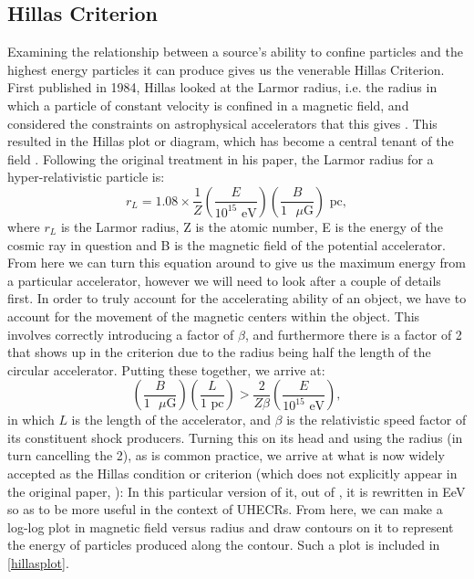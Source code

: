 \subsection{Hillas Criterion}
Examining the relationship between a source's ability to confine particles and the highest energy particles it can produce gives us the venerable Hillas Criterion. First published in 1984, Hillas looked at the Larmor radius, i.e. the radius in which a particle of constant velocity is confined in a magnetic field, and considered the constraints on astrophysical accelerators that this gives \cite{hillas}. This resulted in the Hillas plot or diagram, which has become a central tenant of the field \cite{stanev}. Following the original treatment in his paper, the Larmor radius for a hyper-relativistic particle is:
$$ r_L=1.08\times\frac{1}{Z}\left(\frac{E}{10^{15}\mbox{ eV}}\right)\left(\frac{B}{1\mbox{ $\mu$G}}\right)\mbox{ pc}, $$
where $r_L$ is the Larmor radius, Z is the atomic number, E is the energy of the cosmic ray in question and B is the magnetic field of the potential accelerator. From here we can turn this equation around to give us the maximum energy from a particular accelerator, however we will need to look after a couple of details first. In order to truly account for the accelerating ability of an object, we have to account for the movement of the magnetic centers within the object. This involves correctly introducing a factor of $\beta$, and furthermore there is a factor of 2 that shows up in the criterion due to the radius being half the length of the circular accelerator. Putting these together, we arrive at:
$$\left(\frac{B}{1\mbox{ $\mu$G}}\right) \left(\frac{L}{1\mbox{ pc}}\right)>\frac{2}{Z \beta}\left(\frac{E}{10^{15}\mbox{ eV}}\right),$$
in which $L$ is the length of the accelerator, and $\beta$ is the relativistic speed factor of its constituent shock producers. Turning this on its head and using the radius (in turn cancelling the 2), as is common practice, we arrive at what is now widely accepted as the Hillas condition or criterion (which does not explicitly appear in the original paper, \cite{hillas}):
In this particular version of it, out of \cite{stanev}, it is rewritten in EeV so as to be more useful in the context of UHECRs. From here, we can make a log-log plot in magnetic field versus radius and draw contours on it to represent the energy of particles produced along the contour. Such a plot is included in \autoref{hillasplot}.

